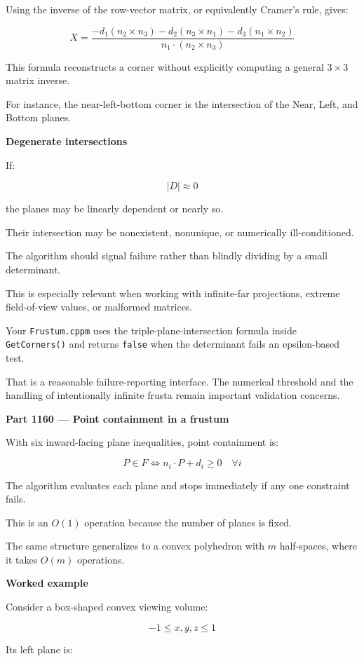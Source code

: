Using the inverse of the row-vector matrix, or equivalently Cramer's rule, gives:

\[
\boxed{ X= \frac{ -d_1(n_2\times n_3) -d_2(n_3\times n_1) -d_3(n_1\times n_2) }{ n_1\cdot(n_2\times n_3) } }
\]

This formula reconstructs a corner without explicitly computing a general \(3\times3\) matrix inverse.

For instance, the near-left-bottom corner is the intersection of the Near, Left, and Bottom planes.

\textbf{Degenerate intersections}

If:

\[
|D|\approx0
\]

the planes may be linearly dependent or nearly so.

Their intersection may be nonexistent, nonunique, or numerically ill-conditioned.

The algorithm should signal failure rather than blindly dividing by a small determinant.

This is especially relevant when working with infinite-far projections, extreme field-of-view values, or malformed matrices.

Your \texttt{Frustum.cppm} uses the triple-plane-intersection formula inside \texttt{GetCorners()} and returns \texttt{false} when the determinant fails an epsilon-based test.

That is a reasonable failure-reporting interface. The numerical threshold and the handling of intentionally infinite frusta remain important validation concerns.

\textbf{Part 1160 --- Point containment in a frustum}

With six inward-facing plane inequalities, point containment is:

\[
\boxed{ P\in F \iff n_i\cdot P+d_i\ge0 \quad\forall i }
\]

The algorithm evaluates each plane and stops immediately if any one constraint fails.

This is an \(O(1)\) operation because the number of planes is fixed.

The same structure generalizes to a convex polyhedron with \(m\) half-spaces, where it takes \(O(m)\) operations.

\textbf{Worked example}

Consider a box-shaped convex viewing volume:

\[
-1\le x,y,z\le1
\]

Its left plane is:

